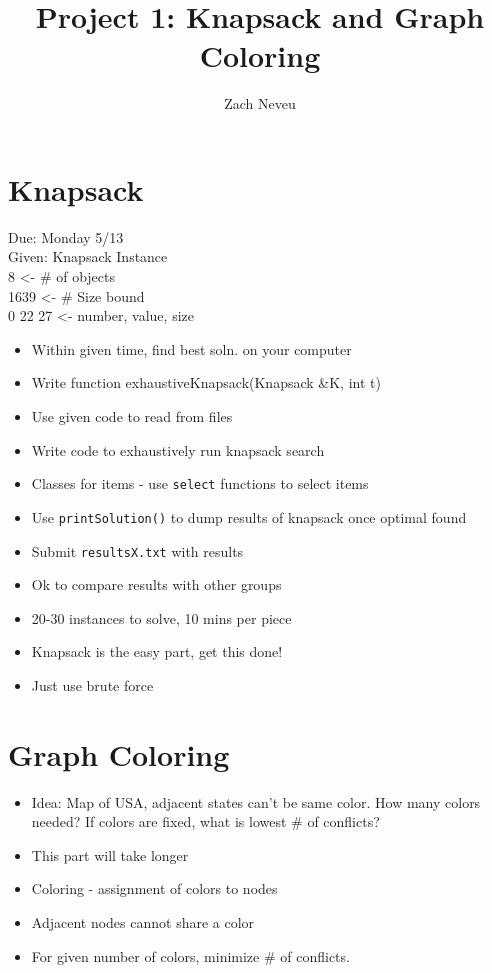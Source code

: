 \documentclass[12pt, letter]{article}
\author{Zach Neveu}
\title{ Project 1: Knapsack and Graph Coloring }
\begin{document}
\maketitle

\section{Knapsack}%
\label{sec:knapsack}

Due: Monday 5/13 \\

Given: Knapsack Instance \\
8	<- \# of objects \\
1639	<- \# Size bound \\
0 22 27 <- number, value, size \\

\begin{itemize}
	\item Within given time, find best soln. on your computer
	\item Write function exhaustiveKnapsack(Knapsack \&K, int t)
	\item Use given code to read from files
	\item Write code to exhaustively run knapsack search
	\item Classes for items - use \verb|select| functions to select items
	\item Use \verb|printSolution()| to dump results of knapsack once optimal found
	\item Submit \verb|resultsX.txt| with results
	\item Ok to compare results with other groups
	\item 20-30 instances to solve, 10 mins per piece
	\item Knapsack is the easy part, get this done!
	\item Just use brute force
\end{itemize}

\section{Graph Coloring}%
\label{sec:graph_coloring}
\begin{itemize}
	\item Idea: Map of USA, adjacent states can't be same color. How many colors needed? If colors are fixed, what is lowest \# of conflicts?
	\item This part will take longer
	\item Coloring - assignment of colors to nodes
	\item Adjacent nodes cannot share a color
	\item For given number of colors, minimize \# of conflicts.
\end{itemize}
\end{document}
